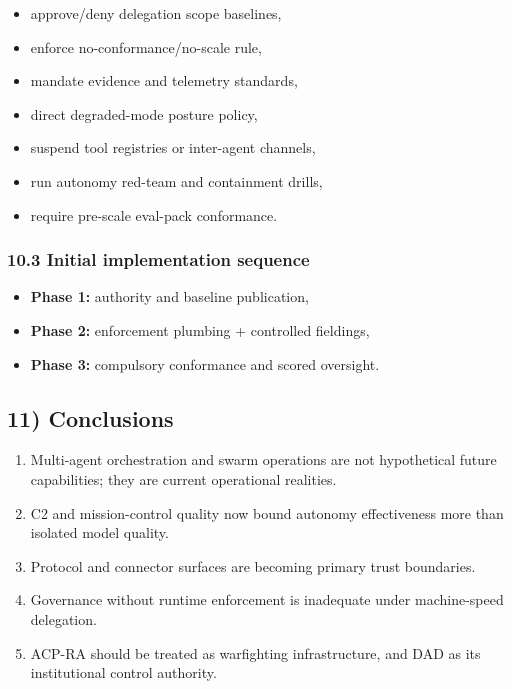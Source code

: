 \documentclass[
]{article}
\providecommand{\tightlist}{%
  \setlength{\itemsep}{0pt}\setlength{\parskip}{0pt}}
\begin{document}
\begin{itemize}
\tightlist
\item
  approve/deny delegation scope baselines,
\item
  enforce no-conformance/no-scale rule,
\item
  mandate evidence and telemetry standards,
\item
  direct degraded-mode posture policy,
\item
  suspend tool registries or inter-agent channels,
\item
  run autonomy red-team and containment drills,
\item
  require pre-scale eval-pack conformance.
\end{itemize}

\hypertarget{initial-implementation-sequence}{%
\subsubsection{10.3 Initial implementation
sequence}\label{initial-implementation-sequence}}

\begin{itemize}
\tightlist
\item
  \textbf{Phase 1:} authority and baseline publication,
\item
  \textbf{Phase 2:} enforcement plumbing + controlled fieldings,
\item
  \textbf{Phase 3:} compulsory conformance and scored oversight.
\end{itemize}

\hypertarget{conclusions}{%
\subsection{11) Conclusions}\label{conclusions}}

\begin{enumerate}
\def\labelenumi{\arabic{enumi}.}
\tightlist
\item
  Multi-agent orchestration and swarm operations are not hypothetical
  future capabilities; they are current operational realities.
\item
  C2 and mission-control quality now bound autonomy effectiveness more
  than isolated model quality.
\item
  Protocol and connector surfaces are becoming primary trust boundaries.
\item
  Governance without runtime enforcement is inadequate under
  machine-speed delegation.
\item
  ACP-RA should be treated as warfighting infrastructure, and DAD as its
  institutional control authority.
\end{enumerate}
\end{document}
